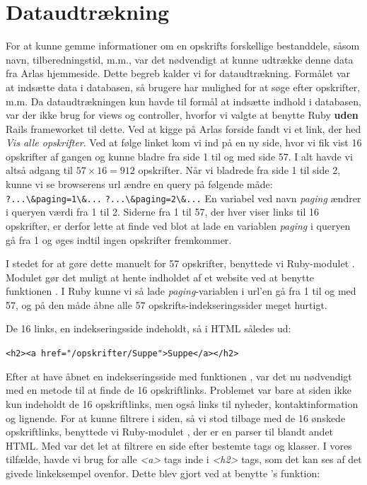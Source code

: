 \section{Dataudtrækning}
For at kunne gemme informationer om en opskrifts forskellige bestanddele, såsom navn, tilberedningstid, m.m., var det nødvendigt at kunne udtrække denne data fra Arlas hjemmeside. Dette begreb kalder vi for dataudtrækning. Formålet var at indsætte data i databasen, så brugere har mulighed for at søge efter opskrifter, m.m. Da dataudtrækningen kun havde til formål at indsætte indhold i databasen, var der ikke brug for views og controller, hvorfor vi valgte at benytte Ruby \textbf{uden} Rails frameworket til dette.
Ved at kigge på Arlas forside fandt vi et link, der hed \textit{Vis alle opskrifter}. Ved at følge linket kom vi ind på en ny side, hvor vi fik vist 16 opskrifter af gangen og kunne bladre fra side 1 til og med side 57. I alt havde vi altså adgang til $57 \times 16 = 912$ opskrifter. Når vi bladrede fra side 1 til side 2, kunne vi se browserens url ændre en query på følgende måde:
\lstinline{?...\&paging=1\&...} 
\lstinline{?...\&paging=2\&...} 
En variabel ved navn \textit{paging} ændrer i queryen værdi fra 1 til 2. Siderne fra 1 til 57, der hver viser links til 16 opskrifter, er derfor lette at finde ved blot at lade en variablen \textit{paging} i queryen gå fra 1 og øges indtil ingen opskrifter fremkommer.

I stedet for at gøre dette manuelt for 57 opskrifter, benyttede vi Ruby-modulet . Modulet gør det muligt at hente indholdet af et website ved at benytte funktionen . I Ruby kunne vi så lade \textit{paging}-variablen i url'en gå fra 1 til og med 57, og på den måde åbne alle 57 opskrifts-indekseringssider meget hurtigt.

De 16 links, en indekseringsside indeholdt, så i HTML således ud:

\lstinline{<h2><a href="/opskrifter/Suppe">Suppe</a></h2>}

Efter at have åbnet en indekseringsside med funktionen , var det nu nødvendigt med en metode til at finde de 16 opskriftlinks. Problemet var bare at siden ikke kun indeholdt de 16 opskriftlinks, men også links til nyheder, kontaktinformation og lignende. For at kunne filtrere i siden, så vi stod tilbage med de 16 ønskede opskriftlinks, benyttede vi Ruby-modulet \cite{rubygemnokogiri}, der er en parser til blandt andet HTML. Med  var det let at filtrere en side efter bestemte tags og klasser. I vores tilfælde, havde vi brug for alle \textit{<a>} tags inde i \textit{<h2>} tags, som det kan ses af det givede linkeksempel ovenfor. Dette blev gjort ved at benytte 's funktion:


